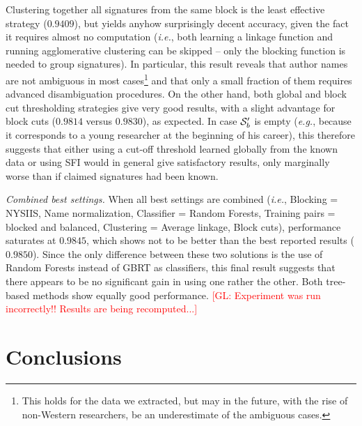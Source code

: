 \documentclass{article}
\newcommand{\glnote}[1]{\textcolor{red}{[GL: #1]}}
\newcommand{\ie}{\emph{i.e.}\xspace}
\newcommand{\eg}{\emph{e.g.}\xspace}
\begin{document}
Clustering together all signatures from the same block is the least effective
strategy ($0.9409$), but yields anyhow surprisingly decent accuracy, given the
fact it requires almost no computation (\ie, both learning a linkage function
and running agglomerative clustering can be skipped -- only the blocking
function is needed to group signatures). In particular, this result reveals
that author names are not ambiguous in most cases\footnote{This holds for the
data we extracted, but may in the future, with the rise of non-Western
researchers, be an underestimate of the ambiguous cases.} and that only a small
fraction of them requires advanced disambiguation procedures. On the other
hand, both global and block cut thresholding strategies give very good results,
with a slight advantage for block cuts ($0.9814$ versus $0.9830$), as expected.
In case ${\cal S}^\prime_b$ is empty (\eg, because it corresponds to a young
researcher at the beginning of his career), this therefore suggests that either using
a cut-off threshold learned globally from the known data or using SFI would in general give
satisfactory results, only marginally worse than if claimed signatures had been
known.

\textit{Combined best settings.} When all best settings are combined (\ie,
Blocking = NYSIIS, Name normalization, Classifier = Random Forests, Training
pairs = blocked and balanced, Clustering = Average linkage, Block cuts),
performance saturates at $0.9845$, which shows not to be better than the best
reported results ($0.9850$). Since the only difference between these two
solutions is the use of Random Forests instead of GBRT as classifiers, this
final result suggests that there appears to be no significant gain in using one rather
the other. Both tree-based methods show equally good performance. \glnote{Experiment was run incorrectly!! Results are being recomputed...}



\section{Conclusions}
\label{conclusions}
\end{document}
